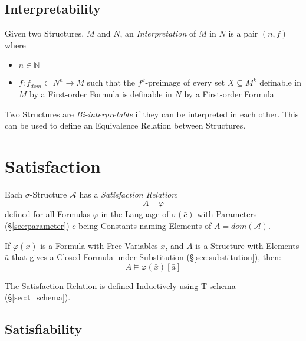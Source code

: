 \subsection{Interpretability}\label{sec:interpretability}

Given two Structures, $M$ and $N$, an \emph{Interpretation} of $M$ in
$N$ is a pair $(n,f)$ where
\begin{itemize}
  \item $n \in \mathbb{N}$
  \item $f:f_{dom} \subset N^n \rightarrow M$ such that the
    $f^k$-preimage of every set $X \subseteq M^k$ definable in $M$ by
    a First-order Formula is definable in $N$ by a First-order Formula
\end{itemize}

Two Structures are \emph{Bi-interpretable} if they can be interpreted
in each other. This can be used to define an Equivalence Relation
between Structures.



\section{Satisfaction}\label{sec:satisfaction}

Each $\sigma$-Structure $\mathcal{A}$ has a \emph{Satisfaction
  Relation}:
\[
    A \vDash \varphi
\]
defined for all Formulas $\varphi$ in the Language of $\sigma(\bar{c})$
with Parameters (\S\ref{sec:parameter}) $\bar{c}$ being Constants
naming Elements of $A = dom(\mathcal{A})$.

If $\varphi(\bar{x})$ is a Formula with Free Variables $\bar{x}$, and $A$
is a Structure with Elements $\bar{a}$ that gives a Closed Formula
under Substitution (\S\ref{sec:substitution}), then:
\[
    A \vDash \varphi(\bar{x})[\bar{a}]
\]

The Satisfaction Relation is defined Inductively using T-schema
(\S\ref{sec:t_schema}).



\subsection{Satisfiability}\label{sec:satisfiability}

